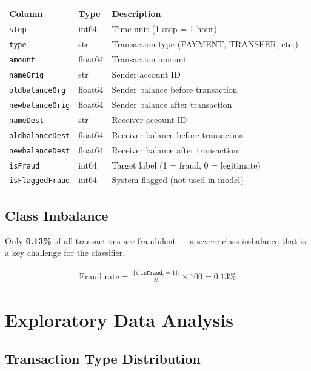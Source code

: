 \documentclass[12pt, a4paper]{article}
\begin{document}
\begin{center}
\begin{tabular}{lll}
\toprule
\textbf{Column} & \textbf{Type} & \textbf{Description} \\
\midrule
\texttt{step}           & int64   & Time unit (1 step = 1 hour) \\
\texttt{type}           & str     & Transaction type (PAYMENT, TRANSFER, etc.) \\
\texttt{amount}         & float64 & Transaction amount \\
\texttt{nameOrig}       & str     & Sender account ID \\
\texttt{oldbalanceOrg}  & float64 & Sender balance before transaction \\
\texttt{newbalanceOrig} & float64 & Sender balance after transaction \\
\texttt{nameDest}       & str     & Receiver account ID \\
\texttt{oldbalanceDest} & float64 & Receiver balance before transaction \\
\texttt{newbalanceDest} & float64 & Receiver balance after transaction \\
\texttt{isFraud}        & int64   & Target label (1 = fraud, 0 = legitimate) \\
\texttt{isFlaggedFraud} & int64   & System-flagged (not used in model) \\
\bottomrule
\end{tabular}
\end{center}

\subsection{Class Imbalance}

Only \textbf{0.13\%} of all transactions are fraudulent — a severe class imbalance that is a key challenge for the classifier.

\begin{align}
\text{Fraud rate} = \frac{|\{i : \texttt{isFraud}_i = 1\}|}{N} \times 100 = 0.13\%
\end{align}

\section{Exploratory Data Analysis}

\subsection{Transaction Type Distribution}
\end{document}
